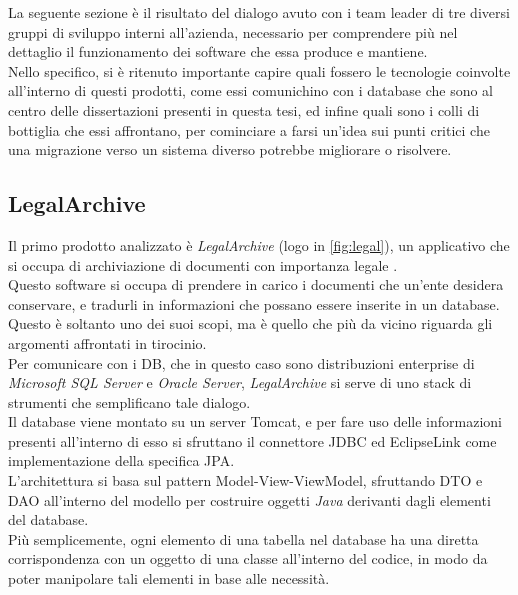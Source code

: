 La seguente sezione è il risultato del dialogo avuto con i team leader di tre diversi gruppi di sviluppo interni all'azienda, necessario per comprendere più nel dettaglio il funzionamento dei software che essa produce e mantiene.\\
Nello specifico, si è ritenuto importante capire quali fossero le tecnologie coinvolte all'interno di questi prodotti, come essi comunichino con i database che sono al centro delle dissertazioni presenti in questa tesi, ed infine quali sono i colli di bottiglia che essi affrontano, per cominciare a farsi un'idea sui punti critici che una migrazione verso un sistema diverso potrebbe migliorare o risolvere.\\

\subsection{LegalArchive}
Il primo prodotto analizzato è \textit{LegalArchive} (logo in \autoref{fig:legal}), un applicativo che si occupa di archiviazione di documenti con importanza legale \cite{site:legalarchive}.\\
Questo software si occupa di prendere in carico i documenti che un'ente desidera conservare, e tradurli in informazioni che possano essere inserite in un database.\\
Questo è soltanto uno dei suoi scopi, ma è quello che più da vicino riguarda gli argomenti affrontati in tirocinio.\\
Per comunicare con i DB, che in questo caso sono distribuzioni enterprise di \textit{Microsoft SQL Server} e \textit{Oracle Server}, \textit{LegalArchive} si serve di uno stack di strumenti che semplificano tale dialogo.\\
Il database viene montato su un server \gls{Tomcat}, e per fare uso delle informazioni presenti all'interno di esso si sfruttano il connettore \gls{JDBC} ed \gls{EclipseLink} come implementazione della specifica \gls{JPA}.\\
L'architettura si basa sul pattern \gls{Model-View-ViewModel}, sfruttando \gls{DTO} e \gls{DAO} all'interno del modello per costruire oggetti \textit{Java} derivanti dagli elementi del database.\\
Più semplicemente, ogni elemento di una tabella nel database ha una diretta corrispondenza con un oggetto di una classe all'interno del codice, in modo da poter manipolare tali elementi in base alle necessità.\\
